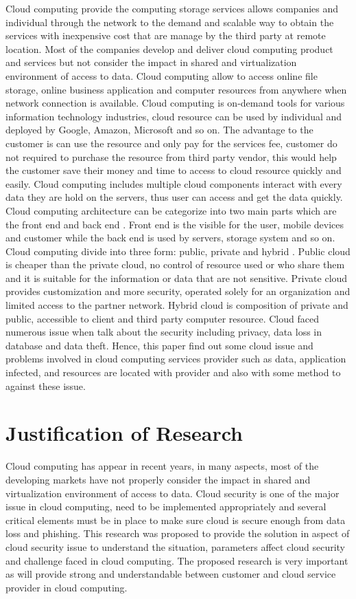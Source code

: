 \documentclass[a4paper, 12pt]{article}
\begin{document}
Cloud computing provide the computing storage services allows companies and individual through the network to the demand and scalable way to obtain the services with inexpensive cost that are manage by the third party at remote location. Most of the companies develop and deliver cloud computing product and services but not consider the impact in shared and virtualization environment of access to data. Cloud computing allow to access online file storage, online business application and computer resources from anywhere when network connection is available. Cloud computing is on-demand tools for various information technology industries, cloud resource can be used by individual and deployed by Google, Amazon, Microsoft and so on. The advantage to the customer is can use the resource and only pay for the services fee, customer do not required to purchase the resource from third party vendor, this would help the customer save their money and time to access to cloud resource quickly and easily. Cloud computing includes multiple cloud components interact with every data they are hold on the servers, thus user can access and get the data quickly. Cloud computing architecture can be categorize into two main parts which are the front end and back end \cite{strickland2008cloud}. Front end is the visible for the user, mobile devices and customer while the back end is used by servers, storage system and so on. Cloud computing divide into three form: public, private and hybrid \cite{armbrust2010view}. Public cloud is cheaper than the private cloud, no control of resource used or who share them and it is suitable for the information or data that are not sensitive. Private cloud provides customization and more security, operated solely for an organization and limited access to the partner network.  Hybrid cloud is composition of private and public, accessible to client and third party computer resource. Cloud faced numerous issue when talk about the security including privacy, data loss in database and data theft. Hence, this paper find out some cloud issue and problems involved in cloud computing services provider such as data, application infected, and resources are located with provider and also with some method to against these issue.

\section{Justification of Research}

Cloud computing has appear in recent years, in many aspects, most of the developing markets have not properly consider the impact in shared and virtualization environment of access to data. Cloud security is one of the major issue in cloud computing, need to be implemented appropriately and several critical elements must be in place to make sure cloud is secure enough from data loss and phishing. This research was proposed to provide the solution in aspect of cloud security issue to understand the situation, parameters affect cloud security and challenge faced in cloud computing. The proposed research is very important as will provide strong and understandable between customer and cloud service provider in cloud computing.
\end{document}
